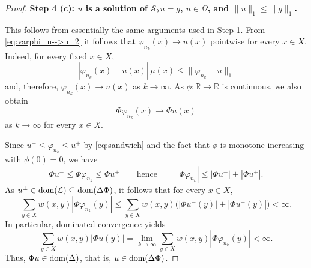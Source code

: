 \documentclass[letterpaper]{article}
\theoremstyle{definition}
\theoremstyle{named}
\numberwithin{equation}{section}
\newcommand{\dom}{\textnormal{dom}} %
\newcommand{\Deltaphi}{\mathcal{L}}
\begin{document}
\begin{proof}
\medskip
\noindent
\textbf{Step 4 (c): $u$ is a solution of $\mathcal{S}_\lambda u=g$, 
$u \in \Omega$, and $\|u\|_1 \leq \|g\|_1$.}

This follows from essentially the same arguments used in Step 1. From \eqref{eq:varphi_n-->u_2} it follows that \(\varphi_{n_k}(x)\to u(x)\) pointwise for every \(x\in X\). Indeed, for every fixed \(x\in X\),
\[
|\varphi_{n_k}(x)-u(x)|\,\mu(x)\le \|\varphi_{n_k}-u\|_1
\]
and, therefore, $\varphi_{n_k}(x)\to u(x)$ as $k\to\infty$. 
As $\phi\colon \mathbb R\to\mathbb R$ is continuous, we also obtain
\begin{equation}\label{eq:continuity}
\Phi\varphi_{n_k}(x)\to \Phi u(x)
\end{equation}
as $k \to \infty$ for every $x\in X$.




Since $u^- \le \varphi_{n_k} \le u^+$ by \eqref{eq:sandwich} and
the fact that {$\phi$ is monotone increasing with $\phi(0)=0$}, we have
\[
\Phi u^- \le \Phi \varphi_{n_k} \le \Phi u^+
\qquad\text{hence }\qquad
|\Phi \varphi_{n_k}| \le |\Phi u^-|+|\Phi u^+|.
\]
As $u^\pm  \in \dom(\Deltaphi) \subseteq \dom(\Delta\Phi)$, it follows that for every $x\in X$,
\begin{equation}\label{eq:dominate_convergence_2}
\sum_{y\in X} w(x,y)|\Phi \varphi_{n_k}(y)|
\le
\sum_{y\in X} w(x,y)\bigl(|\Phi u^-(y)|+|\Phi u^+(y)|\bigr)
<\infty.
\end{equation}
In particular, dominated convergence yields
$$
 \sum_{y\in X} w(x,y)|\Phi  u(y)| = \lim_{k\to\infty} \sum_{y\in X} w(x,y)|\Phi  \varphi_{n_k}(y)| < \infty.
$$
Thus, $\Phi u\in \dom(\Delta)$, that is, $u\in \dom(\Delta\Phi)$.


\end{proof}
\end{document}
